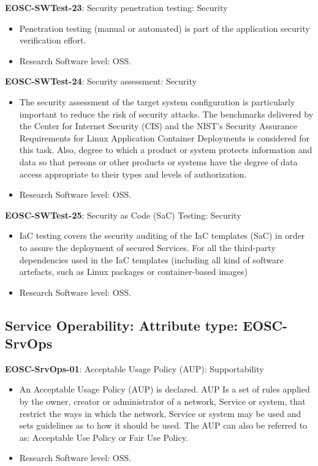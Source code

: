 \textbf{EOSC-SWTest-23}: Security penetration testing: Security

\begin{itemize}
    \item Penetration testing (manual or automated) is part of the application security verification effort. \cite{orviz_fernandez_eosc-synergy_2020}
    \item Research Software level: OSS.
\end{itemize}

\textbf{EOSC-SWTest-24}: Security assessment: Security

\begin{itemize}
    \item The security assessment of the target system configuration is particularly important to reduce the risk of security attacks. The benchmarks delivered by the Center for Internet Security (CIS) and the NIST's Security Assurance Requirements for Linux Application Container Deployments is considered for this task. Also, degree to which a product or system protects information and data so that persons or other products or
systems have the degree of data access appropriate to their types and levels of authorization. \cite{iso_25010_2011_2017,orviz_fernandez_eosc-synergy_2020}
    \item Research Software level: OSS.
\end{itemize}

\textbf{EOSC-SWTest-25}: Security as Code (SaC) Testing: Security

\begin{itemize}
    \item IaC testing covers the security auditing of the IaC templates (SaC) in order to assure the deployment of secured Services. For all the third-party dependencies used in the IaC templates (including all kind of software artefacts, such as Linux packages or container-based images) \cite{orviz_fernandez_eosc-synergy_2020}
    \item Research Software level: OSS.
\end{itemize}

\subsection{Service Operability: Attribute type: EOSC-SrvOps}

\textbf{EOSC-SrvOps-01}: Acceptable Usage Policy (AUP): Supportability

\begin{itemize}
    \item An Acceptable Usage Policy (AUP) is declared. AUP Is a set of rules applied by the owner, creator or administrator of a network, Service or system, that restrict the ways in which the network, Service or system may be used and sets guidelines as to how it should be used. The AUP can also be referred to as: Acceptable Use Policy or Fair Use Policy. \cite{orviz_fernandez_eosc-synergy_2020}
    \item Research Software level: OSS.
\end{itemize}

